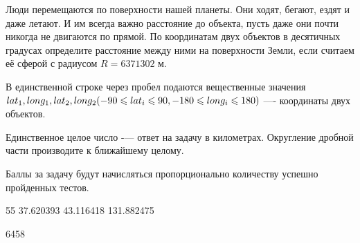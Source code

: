 
Люди перемещаются по поверхности нашей планеты. Они ходят, бегают, ездят и даже летают. И им всегда важно расстояние до объекта, пусть даже они почти никогда не двигаются по прямой. По координатам двух объектов в десятичных градусах определите расстояние между ними на поверхности Земли, если считаем её сферой с радиусом $R = 6371302$ м.


В единственной строке через пробел подаются вещественные значения $ lat_1, long_1, lat_2, long_2 \space(-90 \leq lat_i \leq 90, -180 \leq long_i \leq 180) $ —- координаты двух объектов.

\outputfmtSection

Единственное целое число -— ответ на задачу в километрах. Округление дробной части производите к ближайшему целому.

\markSection

Баллы за задачу будут начисляться пропорционально количеству успешно пройденных тестов.


\begin{myverbbox}[\small]{\vinput}
    55 37.620393 43.116418 131.882475
\end{myverbbox}

\begin{myverbbox}[\small]{\voutput}
    6458
\end{myverbbox}

